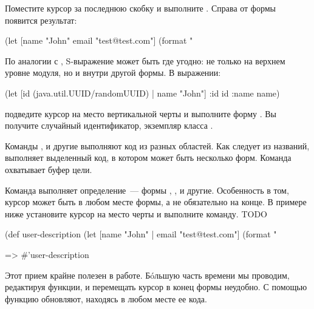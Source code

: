 Поместите курсор за последнюю скобку и выполните . Справа от формы появится результат:

\begin{english}
  \begin{clojure}
(let [name "John"
      email "test@test.com"]
  (format "%
  \end{clojure}
\end{english}

По аналогии с , S-выражение может быть где угодно: не только на верхнем уровне модуля, но и внутри другой формы. В выражении:

\begin{english}
  \begin{clojure}
(let [id (java.util.UUID/randomUUID) |
      name "John"]
  {:id id
   :name name})
  \end{clojure}
\end{english}

подведите курсор на место вертикальной черты и выполните форму . Вы получите случайный идентификатор, экземпляр класса .

Команды ,  и другие выполняют код из разных областей. Как следует из названий,  выполняет выделенный код, в котором может быть несколько форм. Команда  охватывает буфер цели.

Команда  выполняет определение~--- формы , ,  и другие. Особенность в том, курсор может быть в любом месте формы, а не обязательно на конце. В примере ниже установите курсор на место черты и выполните команду. TODO %

\begin{english}
  \begin{clojure}
(def user-description
  (let [name "John" |
        email "test@test.com"]
    (format "%

=> #'user-description
  \end{clojure}
\end{english}

Этот прием крайне полезен в работе. Бóльшую часть времени мы проводим, редактируя функции, и перемещать курсор в конец формы неудобно. С помощью  функцию обновляют, находясь в любом месте ее кода.

